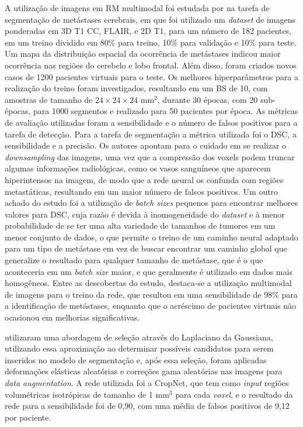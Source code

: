 A utilização de imagens em RM multimodal foi estudada por \cite{Charron:2018} na tarefa de segmentação de metástases cerebrais, em que foi utilizado um \textit{dataset} de imagens ponderadas em 3D T1 CC, FLAIR, e 2D T1, para um número de 182 pacientes, em um treino dividido em 80\% para treino, 10\% para validação e 10\% para teste. Um mapa da distribuição espacial da ocorrência de metástases indicou maior ocorrência nas regiões do cerebelo e lobo frontal. Além disso, foram criados novos casos de 1200 pacientes virtuais para o teste. Os melhores hiperparâmetros para a realização do treino foram investigados, resultando em um BS de 10, com amostras de tamanho de $24\times24\times24$ mm$^2$, durante 30 épocas, com 20 sub-épocas, para 1000 segmentos e realizado para 50 pacientes por época. As métricas de avaliação utilizadas foram a sensibilidade e o número de falsos positivos para a tarefa de detecção. Para a tarefa de segmentação a métrica utilizada foi o DSC, a sensibilidade e a precisão. Os autores apontam para o cuidado em se realizar o \textit{downsampling} das imagens, uma vez que a compressão dos voxels podem truncar algumas informações radiológicas, como os vasos sanguíneos que aparecem hiperintensos na imagem, de modo que a rede neural os confunda com regiões metastáticas, resultando em um maior número de falsos positivos. Um outro achado do estudo foi a utilização de \textit{batch sizes} pequenos para encontrar melhores valores para DSC, cuja razão é devida à inomogeneidade do \textit{dataset} e à menor probabilidade de se ter uma alta variedade de tamanhos de tumores em um menor conjunto de dados, o que permite o treino de um caminho neural adaptado para um tipo de metástase em vez de buscar encontrar um caminho global que generalize o resultado para qualquer tamanho de metástase, que é o que aconteceria em um \textit{batch size} maior, e que geralmente é utilizado em dados mais homogêneos. Entre as descobertas do estudo, destaca-se a utilização multimodal de imagens para o treino da rede, que resultou em uma sensibilidade de 98\% para a identificação de metástases, enquanto que o acréscimo de pacientes virtuais não ocasionou em melhorias significativas.

\cite{Dikici:2020} utilizaram uma abordagem de seleção através do Laplaciano da Gaussiana, utilizando essa aproximação ao determinar possíveis candidatos para serem inseridos no modelo de segmentação e, após essa seleção, foram aplicadas deformações elásticas aleatórias e correções gama aleatórias nas imagens para \textit{data augmentation}. A rede utilizada foi a CropNet, que tem como \textit{input} regiões volumétricas isotrópicas de tamanho de 1 mm$^3$ para cada \textit{voxel}, e o resultado da rede para a sensibilidade foi de 0,90, com uma média de falsos positivos de 9,12 por paciente.

